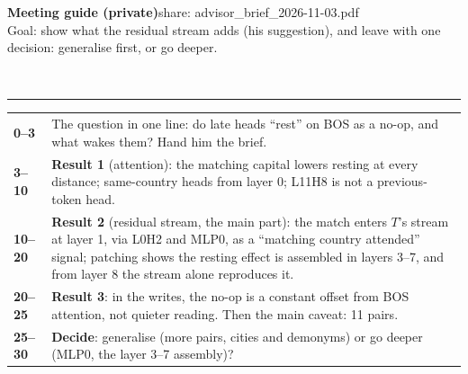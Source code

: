 \documentclass[10pt]{article}
\newcommand{\head}[1]{\par\vspace{5pt}{\large\bfseries #1}\\[-4pt]\rule{\linewidth}{0.5pt}\par}
\begin{document}
{\LARGE\bfseries Meeting guide (private)}\hfill{\color{muted}\small share: advisor\_brief\_2026-11-03.pdf}\\[2pt]
{\small\color{ink2} Goal: show what the residual stream adds (his suggestion), and leave with one decision:
generalise first, or go deeper.}

\head{30-minute plan}
\begin{tabularx}{\linewidth}{@{}>{\bfseries}l X@{}}
0--3 & The question in one line: do late heads ``rest'' on BOS as a no-op, and what wakes them? Hand him the brief. \\
3--10 & \textbf{Result 1} (attention): the matching capital lowers resting at every distance; same-country heads from layer 0; L11H8 is not a previous-token head. \\
10--20 & \textbf{Result 2} (residual stream, the main part): the match enters $T$'s stream at layer 1, via L0H2 and MLP0, as a ``matching country attended'' signal; patching shows the resting effect is assembled in layers 3--7, and from layer 8 the stream alone reproduces it. \\
20--25 & \textbf{Result 3}: in the writes, the no-op is a constant offset from BOS attention, not quieter reading. Then the main caveat: 11 pairs. \\
25--30 & \textbf{Decide}: generalise (more pairs, cities and demonyms) or go deeper (MLP0, the layer 3--7 assembly)? \\
\end{tabularx}
\end{document}
